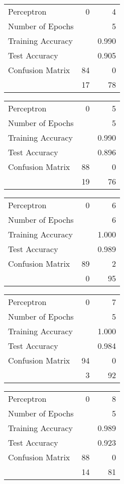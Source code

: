 \documentclass[11pt]{article}
\begin{document}
\begin{minipage}[t]{0.5\textwidth}
\begin{tabular}{|l | r r|}
\hline Perceptron & 0 & 4\\
Number of Epochs & & 5\\
Training Accuracy & & 0.990\\
Test Accuracy & & 0.905\\
Confusion Matrix & 84 & 0\\
 &17 & 78\\ \hline
\end{tabular}
\end{minipage}
\begin{minipage}[t]{0.5\textwidth}
\begin{tabular}{|l | r r|}
\hline Perceptron & 0 & 5\\
Number of Epochs & & 5\\
Training Accuracy & & 0.990\\
Test Accuracy & & 0.896\\
Confusion Matrix & 88 & 0\\
 &19 & 76\\ \hline
\end{tabular}
\end{minipage}
\begin{minipage}[t]{0.5\textwidth}
\begin{tabular}{|l | r r|}
\hline Perceptron & 0 & 6\\
Number of Epochs & & 6\\
Training Accuracy & & 1.000\\
Test Accuracy & & 0.989\\
Confusion Matrix & 89 & 2\\
 &0 & 95\\ \hline
\end{tabular}
\end{minipage}
\begin{minipage}[t]{0.5\textwidth}
\begin{tabular}{|l | r r|}
\hline Perceptron & 0 & 7\\
Number of Epochs & & 5\\
Training Accuracy & & 1.000\\
Test Accuracy & & 0.984\\
Confusion Matrix & 94 & 0\\
 &3 & 92\\ \hline
\end{tabular}
\end{minipage}
\begin{minipage}[t]{0.5\textwidth}
\begin{tabular}{|l | r r|}
\hline Perceptron & 0 & 8\\
Number of Epochs & & 5\\
Training Accuracy & & 0.989\\
Test Accuracy & & 0.923\\
Confusion Matrix & 88 & 0\\
 &14 & 81\\ \hline
\end{tabular}
\end{minipage}
\end{document}
